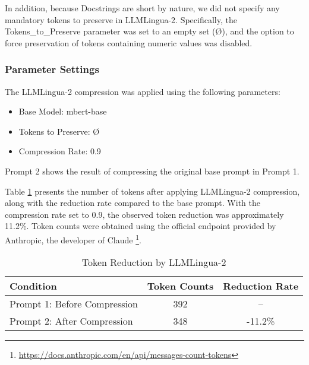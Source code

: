 In addition, because Docstrings are short by nature, we did not specify any mandatory tokens to preserve in LLMLingua-2. Specifically, the Tokens\_to\_Preserve parameter was set to an empty set (Ø), and the option to force preservation of tokens containing numeric values was disabled.

\subsubsection{Parameter Settings}
The LLMLingua-2 compression was applied using the following parameters:

\begin{itemize}[label={$\bullet$}]
    \item Base Model: mbert-base
\vspace{0.2cm}
    \item Tokens to Preserve: Ø
\vspace{0.2cm}
    \item Compression Rate: 0.9
\end{itemize}

Prompt 2 shows the result of compressing the original base prompt in Prompt 1.



Table \ref{tab:token_reduction_llmlingua2} presents the number of tokens after applying LLMLingua-2 compression, along with the reduction rate compared to the base prompt. With the compression rate set to 0.9, the observed token reduction was approximately 11.2\%. Token counts were obtained using the official endpoint provided by Anthropic, the developer of Claude \footnote{\url{https://docs.anthropic.com/en/api/messages-count-tokens}}.

\begin{table}[h!]
  \centering
  \caption{Token Reduction by LLMLingua-2}
  \label{tab:token_reduction_llmlingua2}
  \begin{tabular}{|l|c|c|}
    \hline
    \textbf{Condition} & \textbf{Token Counts} & \textbf{Reduction Rate} \\
    \hline
    Prompt 1: Before Compression & 392 & -- \\
    Prompt 2: After Compression  & 348 & -11.2\% \\
    \hline
  \end{tabular}
\end{table}
